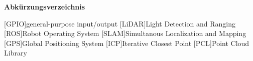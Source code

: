\Huge\bf Abkürzungsverzeichnis \\
\normalsize\rm

\begin{acronym}

[GPIO]{general-purpose input/output}
[LiDAR]{Light Detection and Ranging}
[ROS]{Robot Operating System}
[SLAM]{Simultanous Localization and Mapping}
[GPS]{Global Positioning System}
[ICP]{Iterative Closest Point}
[PCL]{Point Cloud Library}
    
\end{acronym}

\newpage